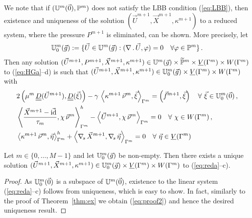 We note that if $(\uspacedisc{0}{m},\pspace^m)$ does not satisfy the LBB
condition (\ref{eq:LBB}), then existence and uniqueness of the solution
$(\vec U^{m+1},\vec X^{m+1},\kappa^{m+1})$ to a reduced system, where the
pressure $P^{m+1}$ is eliminated, can be shown. More precisely, let
\begin{equation}\label{eq:divfree_u_space}
\uspacesimple^m_0(\vec g) :=
\{ \vec U \in \uspacedisc{g}{m} : (\nabla\,.\,\vec U, \varphi) = 0
\quad \forall \varphi \in \pspace^m \}\,.
\end{equation}
Then any solution $(\vec U^{m+1}, P^{m+1}, \vec X^{m+1}, \kappa^{m+1})
\in \uspacedisc{g}{m}\times \pnormspace^m \times \Vh \times \Wh$
to (\ref{eq:HGa}--d) is such that $(\vec U^{m+1}, \vec X^{m+1}, \kappa^{m+1})
\in \uspacesimple^m_0(\vec g)\times \Vh \times \Wh$ with
\begin{subequations}
\begin{align}
& 2\left(\mu^m\,\mat D(\vec U^{m+1}), \mat D(\vec \xi) \right)
- \gamma\,\left\langle \kappa^{m+1}\,\vec\nu^m,\vec\xi\right\rangle_{\Gamma^m}
= \left(\vec f^{m+1},\vec \xi\right) \quad \forall\ \vec\xi \in
\uspacesimple^m_0(\vec 0)\,, \label{eq:reda}\\
&  \left\langle \frac{\vec X^{m+1} - \vec\id}{\tau_m} ,\chi\,\vec\nu^m
\right\rangle_{\Gamma^m}^h - \left\langle \vec U^{m+1}, \chi\,\vec\nu^m
\right\rangle_{\Gamma^m}  = 0 \quad \forall\ \chi \in \Wh\,,
\label{eq:redb} \\
& \left\langle \kappa^{m+1}\,\vec\nu^m, \vec\eta \right\rangle_{\Gamma^m}^h
+ \left\langle \nabs\,\vec X^{m+1}, \nabs\,\vec \eta \right\rangle_{\Gamma^m} =
0 \quad \forall\ \vec\eta \in \Vh \label{eq:redc}
\end{align}
\end{subequations}

\begin{theorem} \label{thm:stabreduced}
Let $m \in \{0,\ldots,M-1\}$ and let $\uspacesimple^m_0(\vec g)$ be non-empty.
Then there exists a unique solution $(\vec U^{m+1}, \vec X^{m+1}, \kappa^{m+1})
\in \uspacesimple^m_0(\vec g) \times \Vh \times \Wh$ to (\ref{eq:reda}--c).
\end{theorem}
\begin{proof}
As $\uspacesimple^m_0(\vec 0)$ is a subspace of $\uspacedisc{0}{m}$,
existence to the linear system (\ref{eq:reda}--c) follows from uniqueness,
which is easy to show. In fact, similarly to the proof of Theorem~\ref{thm:ex}
we obtain (\ref{eq:proof2}) and hence the desired uniqueness result.
\end{proof}


